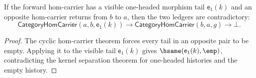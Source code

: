 \begin{theorem}
\label{thm:category-e1-morphism-cycle-absurd}
If the forward hom-carrier has a visible one-headed morphism tail
$\mathsf{e}_1(k)$ and an opposite hom-carrier returns from $b$ to $a$, then
the two ledgers are contradictory:
$$
\mathsf{CategoryHomCarrier}(a,b,\mathsf{e}_1(k))
\to
\mathsf{CategoryHomCarrier}(b,a,g)
\to
\bot.
$$
\end{theorem}
\begin{proof}
The cyclic hom-carrier theorem forces every tail in an opposite pair to be
empty. Applying it to the visible tail $\mathsf{e}_1(k)$ gives
$\hsame(\mathsf{e}_1(k),\emp)$, contradicting the kernel separation theorem
for one-headed histories and the empty history.
\end{proof}

